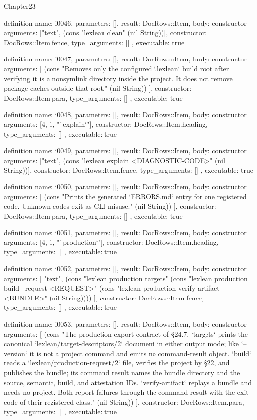 \begin{lexlean}{Chapter23}
\begin{semanticmodule}
definition{
  name: i0046,
  parameters: [],
  result: DocRows::Item,
  body: constructor{
    arguments: ["text", (cons "lexlean clean" (nil String))],
    constructor: DocRows::Item.fence,
    type_arguments: []
  },
  executable: true
}

definition{
  name: i0047,
  parameters: [],
  result: DocRows::Item,
  body: constructor{
    arguments: [
      (cons "Removes only the configured `.lexlean` build root after verifying it is a nonsymlink directory inside the project. It does not remove package caches outside that root." (nil String))
    ],
    constructor: DocRows::Item.para,
    type_arguments: []
  },
  executable: true
}

definition{
  name: i0048,
  parameters: [],
  result: DocRows::Item,
  body: constructor{
    arguments: [4, 1, "`explain`"],
    constructor: DocRows::Item.heading,
    type_arguments: []
  },
  executable: true
}

definition{
  name: i0049,
  parameters: [],
  result: DocRows::Item,
  body: constructor{
    arguments: ["text", (cons "lexlean explain <DIAGNOSTIC-CODE>" (nil String))],
    constructor: DocRows::Item.fence,
    type_arguments: []
  },
  executable: true
}

definition{
  name: i0050,
  parameters: [],
  result: DocRows::Item,
  body: constructor{
    arguments: [
      (cons "Prints the generated `ERRORS.md` entry for one registered code. Unknown codes exit as CLI misuse." (nil String))
    ],
    constructor: DocRows::Item.para,
    type_arguments: []
  },
  executable: true
}

definition{
  name: i0051,
  parameters: [],
  result: DocRows::Item,
  body: constructor{
    arguments: [4, 1, "`production`"],
    constructor: DocRows::Item.heading,
    type_arguments: []
  },
  executable: true
}

definition{
  name: i0052,
  parameters: [],
  result: DocRows::Item,
  body: constructor{
    arguments: [
      "text",
      (cons "lexlean production targets" (cons "lexlean production build --request <REQUEST>" (cons "lexlean production verify-artifact <BUNDLE>" (nil String))))
    ],
    constructor: DocRows::Item.fence,
    type_arguments: []
  },
  executable: true
}

definition{
  name: i0053,
  parameters: [],
  result: DocRows::Item,
  body: constructor{
    arguments: [
      (cons "The production export contract of §24.7. `targets` prints the canonical `lexlean/target-descriptors/2` document in either output mode; like `--version` it is not a project command and emits no command-result object. `build` reads a `lexlean/production-request/2` file, verifies the project by §22, and publishes the bundle; its command result names the bundle directory and the source, semantic, build, and attestation IDs. `verify-artifact` replays a bundle and needs no project. Both report failures through the command result with the exit code of their registered class." (nil String))
    ],
    constructor: DocRows::Item.para,
    type_arguments: []
  },
  executable: true
}


\end{semanticmodule}
\end{lexlean}
